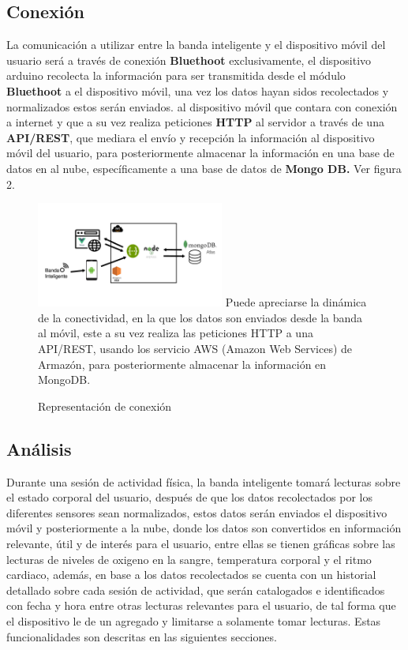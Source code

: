 \documentclass[osajnl,twocolumn,showpacs,superscriptaddress,10pt]{revtex4-1}
\begin{document}
\subsection{Conexión}
    La comunicación a utilizar entre la banda inteligente y el dispositivo móvil del usuario será a través de conexión \textbf{Bluethoot} exclusivamente, el dispositivo arduino recolecta la información para ser transmitida desde el módulo \textbf{Bluethoot} a el dispositivo móvil, una vez los datos hayan sidos recolectados y normalizados estos serán enviados.  al dispositivo móvil que contara con conexión a internet y que a su vez realiza peticiones \textbf{HTTP} al servidor a través de una \textbf{API/REST}, que mediara el envío y recepción la información al dispositivo móvil del usuario, para posteriormente almacenar la información en una base de datos en al nube, específicamente a una base de datos de \textbf{Mongo DB.} Ver figura 2. \newline
\begin{figure} [H] \centering 
\caption{Representación de conexión}
\includegraphics[width=0.55\textwidth]{Arquitectura.png} 
Puede apreciarse la dinámica de la conectividad, en la que los datos son enviados desde la banda al móvil, este a su vez realiza las peticiones HTTP a una API/REST, usando los servicio AWS (Amazon Web Services) de Armazón, para posteriormente almacenar la información en MongoDB.
\end{figure}

\subsection{Análisis}
    Durante una sesión de actividad física, la banda inteligente tomará lecturas sobre el estado corporal del usuario, después de que los datos recolectados por los diferentes sensores sean normalizados, estos datos serán enviados el dispositivo móvil y posteriormente a la nube, donde los datos son convertidos en información relevante, útil y de interés para el usuario, entre ellas se tienen gráficas sobre las lecturas de niveles de oxigeno en la sangre, temperatura corporal y el ritmo cardiaco, además, en base a los datos recolectados se cuenta con un historial detallado sobre cada sesión de actividad, que serán catalogados e identificados con fecha y hora entre otras lecturas relevantes para el usuario, de tal forma que el dispositivo le de un agregado y limitarse a solamente tomar lecturas. Estas funcionalidades son descritas en las siguientes secciones.
    
\end{document}
